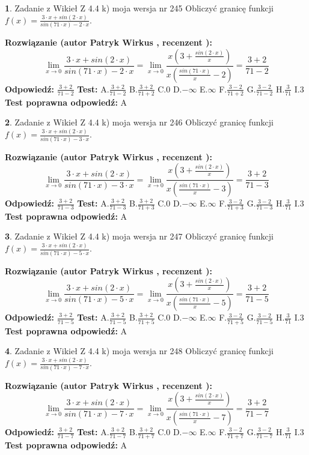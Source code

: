 \documentclass[12pt, a4paper]{article}
\theoremstyle{definition} %
\newtheorem{zad}{}
\newcommand{\zadStart}[1]{\begin{zad}#1\newline}
\newcommand{\zadStop}{\end{zad}}
\newcommand{\rozwStart}[2]{\noindent \textbf{Rozwiązanie (autor #1 , recenzent #2): }\newline}
\newcommand{\rozwStop}{\newline}
\newcommand{\odpStart}{\noindent \textbf{Odpowiedź:}\newline}
\newcommand{\odpStop}{\newline}
\newcommand{\testStart}{\noindent \textbf{Test:}\newline}
\newcommand{\testStop}{\newline}
\newcommand{\kluczStart}{\noindent \textbf{Test poprawna odpowiedź:}\newline}
\newcommand{\kluczStop}{\newline}
\begin{document}
\zadStart{Zadanie z Wikieł Z 4.4 k) moja wersja nr 245}
Obliczyć granicę funkcji $f(x)=\frac{3\cdot x +sin(2\cdot x)}{sin(71\cdot x) -2\cdot x}$.
\zadStop
\rozwStart{Patryk Wirkus}{}
$$\lim\limits_{x\to 0}\frac{3\cdot x +sin(2\cdot x)}{sin(71\cdot x) -2\cdot x}
=\lim\limits_{x\to 0}\frac{x(3+\frac{sin(2\cdot x)}{x})}{x(\frac{sin(71\cdot x)}{x}-2)}
=\frac{3+2}{71-2}$$
\rozwStop
\odpStart
$\frac{3+2}{71-2}$
\odpStop
\testStart
A.$\frac{3+2}{71-2}$
B.$\frac{3+2}{71+2}$
C.$0$
D.$-\infty$
E.$\infty$
F.$\frac{3-2}{71+2}$
G.$\frac{3-2}{71-2}$
H.$\frac{3}{71}$
I.$3$
\testStop
\kluczStart
A
\kluczStop



\zadStart{Zadanie z Wikieł Z 4.4 k) moja wersja nr 246}
Obliczyć granicę funkcji $f(x)=\frac{3\cdot x +sin(2\cdot x)}{sin(71\cdot x) -3\cdot x}$.
\zadStop
\rozwStart{Patryk Wirkus}{}
$$\lim\limits_{x\to 0}\frac{3\cdot x +sin(2\cdot x)}{sin(71\cdot x) -3\cdot x}
=\lim\limits_{x\to 0}\frac{x(3+\frac{sin(2\cdot x)}{x})}{x(\frac{sin(71\cdot x)}{x}-3)}
=\frac{3+2}{71-3}$$
\rozwStop
\odpStart
$\frac{3+2}{71-3}$
\odpStop
\testStart
A.$\frac{3+2}{71-3}$
B.$\frac{3+2}{71+3}$
C.$0$
D.$-\infty$
E.$\infty$
F.$\frac{3-2}{71+3}$
G.$\frac{3-2}{71-3}$
H.$\frac{3}{71}$
I.$3$
\testStop
\kluczStart
A
\kluczStop



\zadStart{Zadanie z Wikieł Z 4.4 k) moja wersja nr 247}
Obliczyć granicę funkcji $f(x)=\frac{3\cdot x +sin(2\cdot x)}{sin(71\cdot x) -5\cdot x}$.
\zadStop
\rozwStart{Patryk Wirkus}{}
$$\lim\limits_{x\to 0}\frac{3\cdot x +sin(2\cdot x)}{sin(71\cdot x) -5\cdot x}
=\lim\limits_{x\to 0}\frac{x(3+\frac{sin(2\cdot x)}{x})}{x(\frac{sin(71\cdot x)}{x}-5)}
=\frac{3+2}{71-5}$$
\rozwStop
\odpStart
$\frac{3+2}{71-5}$
\odpStop
\testStart
A.$\frac{3+2}{71-5}$
B.$\frac{3+2}{71+5}$
C.$0$
D.$-\infty$
E.$\infty$
F.$\frac{3-2}{71+5}$
G.$\frac{3-2}{71-5}$
H.$\frac{3}{71}$
I.$3$
\testStop
\kluczStart
A
\kluczStop



\zadStart{Zadanie z Wikieł Z 4.4 k) moja wersja nr 248}
Obliczyć granicę funkcji $f(x)=\frac{3\cdot x +sin(2\cdot x)}{sin(71\cdot x) -7\cdot x}$.
\zadStop
\rozwStart{Patryk Wirkus}{}
$$\lim\limits_{x\to 0}\frac{3\cdot x +sin(2\cdot x)}{sin(71\cdot x) -7\cdot x}
=\lim\limits_{x\to 0}\frac{x(3+\frac{sin(2\cdot x)}{x})}{x(\frac{sin(71\cdot x)}{x}-7)}
=\frac{3+2}{71-7}$$
\rozwStop
\odpStart
$\frac{3+2}{71-7}$
\odpStop
\testStart
A.$\frac{3+2}{71-7}$
B.$\frac{3+2}{71+7}$
C.$0$
D.$-\infty$
E.$\infty$
F.$\frac{3-2}{71+7}$
G.$\frac{3-2}{71-7}$
H.$\frac{3}{71}$
I.$3$
\testStop
\kluczStart
A
\kluczStop
\end{document}
